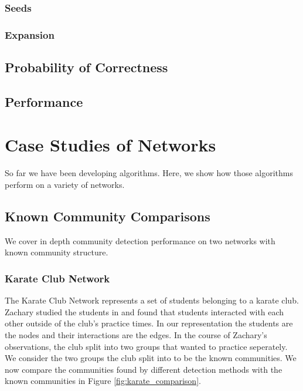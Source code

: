 \documentclass[phd,tocprelim]{cornell}
\begin{document}
\subsection{Seeds}

\subsection{Expansion}

\section{Probability of Correctness}

\section {Performance}



\chapter{Case Studies of Networks}
\label{ch:datasets}

So far we have been developing algorithms.  Here, we show how those algorithms perform on a variety of networks.


\section{Known Community Comparisons}

We cover in depth community detection performance on two networks with known community structure.

\subsection{Karate Club Network}

The Karate Club Network represents a set of students belonging to a karate club.  Zachary studied the students in \cite{zachary} and found that students interacted with each other outside of the club's practice times.  In our representation the students are the nodes and their interactions are the edges.  In the course of Zachary's observations, the club split into two groups that wanted to practice seperately.  We consider the two groups the club split into to be the known communities.  We now compare the communities found by different detection methods with the known communities in Figure \ref{fig:karate_comparison}.
\end{document}
